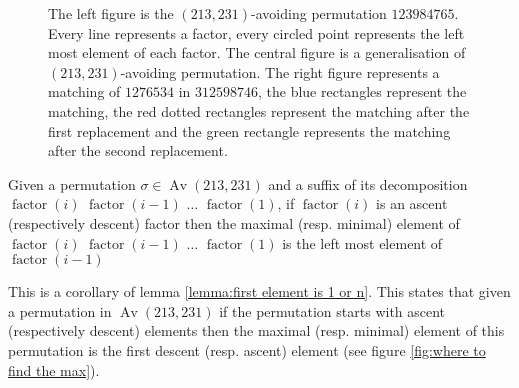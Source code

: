 \documentclass[a4paper]{llncs}
\DeclareMathOperator{\AV}{Av}
\DeclareMathOperator{\factor}{factor}
\begin{document}
\begin{figure}[t]
	
	\caption{The left figure is the  $(213,231)$-avoiding permutation $123984765$. Every line represents a factor, every circled point represents the left most element of each factor. 
	The central figure is a generalisation of $(213,231)$-avoiding permutation.	
	The right figure represents a matching of $1276534$ in $312598746$, the blue rectangles represent the matching, the red dotted rectangles represent the matching after the first replacement and the green rectangle represents the matching after the second replacement.}
	\label{fig:shape of the permutation plus factor}
\end{figure}



\begin{corollary}
\label{corollary:whereIsMax}
Given a permutation $\sigma \in \AV(213,231)$ and a suffix of its 
decomposition $\factor(i)$ $\factor(i-1)$ $\ldots$ $\factor(1)$, 
if $\factor(i)$ is an ascent (respectively descent) factor 
then the maximal (resp. minimal) element of $\factor(i)$ $\factor(i-1)$ $\ldots$ $\factor(1)$
is the left most element of $\factor(i-1)$
\end{corollary}

This is a corollary of lemma \ref{lemma:first element is 1 or n}.
This states that given a permutation in $\AV(213,231)$ 
if the permutation starts with ascent (respectively descent) elements then the maximal (resp. minimal) element of this permutation is the first descent (resp. ascent) element (see figure \ref{fig:where to find the max}).
\end{document}
